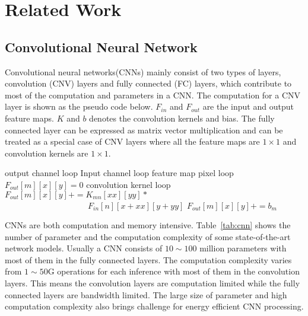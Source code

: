 \section{Related Work}\label{sec:related}
\subsection{Convolutional Neural Network}
Convolutional neural networks(CNNs) mainly consist of two types of layers, convolution (CNV) layers and fully connected (FC) layers, which contribute to most of the computation and parameters in a CNN. The computation for a CNV layer is shown as the pseudo code below. $F_{in}$ and $F_{out}$ are the input and output feature maps. $K$ and $b$ denotes the convolution kernels and bias. The fully connected layer can be expressed as matrix vector multiplication and can be treated as a special case of CNV layers where all the feature maps are $1\times 1$ and convolution kernels are $1\times 1$.

\begin{codebox}
\li \Comment output channel loop
\li {} 
  \Do
\li   \Comment Input channel loop
\li   {}
    \Do
\li  	\Comment feature map pixel loop
\li 	{}
    \Do
\li   	  $F_{out}[m][x][y]=0$
\li 	  \Comment convolution kernel loop
\li 	  {}
          \Do
\li 		$F_{out}[m][x][y] += K_{mn}[xx][yy]*$\\
      $\qquad\qquad\qquad\qquad\qquad F_{in}[n][x+xx][y+yy] $
          \End
\li 	  $F_{out}[m][x][y]+=b_m$
        \End 
    \End
    \End 
\end{codebox}

CNNs are both computation and memory intensive. Table~\ref{tab:cnn} shows the number of parameter and the computation complexity of some state-of-the-art network models. Usually a CNN consists of $10\sim 100$ million parameters with most of them in the fully connected layers. The computation complexity varies from $1\sim 50$G operations for each inference with most of them in the convolution layers. This means the convolution layers are computation limited while the fully connected layers are bandwidth limited. The large size of parameter and high computation complexity also brings challenge for energy efficient CNN processing.



